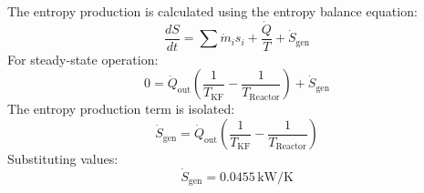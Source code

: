 The entropy production is calculated using the entropy balance equation:  
\[
\frac{dS}{dt} = \sum \dot{m}_i s_i + \frac{\dot{Q}}{T} + \dot{S}_{\text{gen}}
\]  
For steady-state operation:  
\[
0 = \dot{Q}_{\text{out}} \left( \frac{1}{T_{\text{KF}}} - \frac{1}{T_{\text{Reactor}}} \right) + \dot{S}_{\text{gen}}
\]  
The entropy production term is isolated:  
\[
\dot{S}_{\text{gen}} = \dot{Q}_{\text{out}} \left( \frac{1}{T_{\text{KF}}} - \frac{1}{T_{\text{Reactor}}} \right)
\]  
Substituting values:  
\[
\dot{S}_{\text{gen}} = 0.0455 \, \text{kW/K}
\]